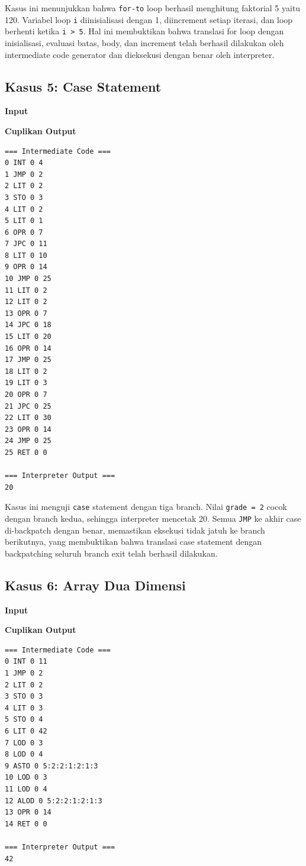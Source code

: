 Kasus ini menunjukkan bahwa \texttt{for-to} loop berhasil menghitung faktorial 5 yaitu 120. Variabel loop \texttt{i} diinisialisasi dengan 1, diincrement setiap iterasi, dan loop berhenti ketika \texttt{i > 5}. Hal ini membuktikan bahwa translasi for loop dengan inisialisasi, evaluasi batas, body, dan increment telah berhasil dilakukan oleh intermediate code generator dan dieksekusi dengan benar oleh interpreter.

\subsection{Kasus 5: Case Statement}
\textbf{Input}\par


\textbf{Cuplikan Output}\par
\begin{lstlisting}[basicstyle=\ttfamily\scriptsize,breaklines=true,frame=single,numbers=none]
=== Intermediate Code ===
0 INT 0 4
1 JMP 0 2
2 LIT 0 2
3 STO 0 3
4 LIT 0 2
5 LIT 0 1
6 OPR 0 7
7 JPC 0 11
8 LIT 0 10
9 OPR 0 14
10 JMP 0 25
11 LIT 0 2
12 LIT 0 2
13 OPR 0 7
14 JPC 0 18
15 LIT 0 20
16 OPR 0 14
17 JMP 0 25
18 LIT 0 2
19 LIT 0 3
20 OPR 0 7
21 JPC 0 25
22 LIT 0 30
23 OPR 0 14
24 JMP 0 25
25 RET 0 0

=== Interpreter Output ===
20
\end{lstlisting}

Kasus ini menguji \texttt{case} statement dengan tiga branch. Nilai \texttt{grade = 2} cocok dengan branch kedua, sehingga interpreter mencetak 20. Semua \texttt{JMP} ke akhir case di-backpatch dengan benar, memastikan eksekusi tidak jatuh ke branch berikutnya, yang membuktikan bahwa translasi case statement dengan backpatching seluruh branch exit telah berhasil dilakukan.

\subsection{Kasus 6: Array Dua Dimensi}
\textbf{Input}\par


\textbf{Cuplikan Output}\par
\begin{lstlisting}[basicstyle=\ttfamily\scriptsize,breaklines=true,frame=single,numbers=none]
=== Intermediate Code ===
0 INT 0 11
1 JMP 0 2
2 LIT 0 2
3 STO 0 3
4 LIT 0 3
5 STO 0 4
6 LIT 0 42
7 LOD 0 3
8 LOD 0 4
9 ASTO 0 5:2:2:1:2:1:3
10 LOD 0 3
11 LOD 0 4
12 ALOD 0 5:2:2:1:2:1:3
13 OPR 0 14
14 RET 0 0

=== Interpreter Output ===
42
\end{lstlisting}

